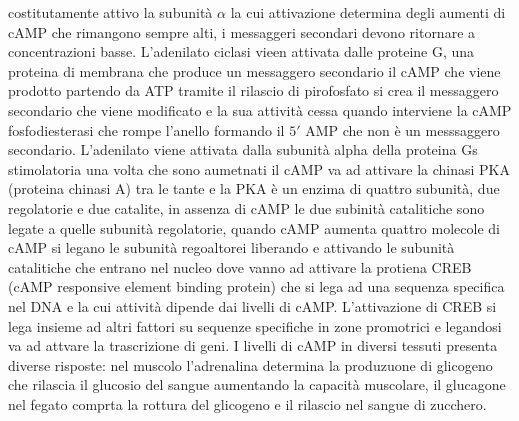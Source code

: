 costitutamente attivo la subunit\`a $\alpha$ la cui attivazione determina degli aumenti di cAMP che rimangono sempre alti, i messaggeri secondari devono ritornare a concentrazioni 
basse. L'adenilato ciclasi vieen attivata dalle proteine G, una proteina di membrana che produce un messaggero secondario il cAMP che viene prodotto partendo da ATP tramite il rilascio
di pirofosfato si crea il messaggero secondario che viene modificato e la sua attivit\`a cessa quando interviene la cAMP fosfodiesterasi che rompe l'anello formando il $5'$ AMP che non
\`e un messsaggero secondario. L'adenilato viene attivata dalla subunit\`a alpha della proteina Gs stimolatoria una volta che sono aumetnati il cAMP va ad attivare la chinasi PKA 
(proteina chinasi A) tra le tante e la PKA \`e un enzima di quattro subunit\`a, due regolatorie e due catalite, in assenza di cAMP le due subinit\`a catalitiche sono legate a quelle
subunit\`a regolatorie, quando cAMP aumenta quattro molecole di cAMP si legano le subunit\`a regoaltorei liberando e attivando le subunit\`a catalitiche che entrano nel nucleo dove vanno
ad attivare la protiena CREB (cAMP responsive element binding protein) che si lega ad una sequenza specifica nel DNA e la cui attivit\`a dipende dai livelli di cAMP. L'attivazione di
CREB si lega insieme ad altri fattori su sequenze specifiche in zone promotrici e legandosi va ad attvare la trascrizione di geni. I livelli di cAMP in diversi tessuti presenta diverse
risposte: nel muscolo l'adrenalina determina la produzuone di glicogeno che rilascia il glucosio del sangue aumentando la capacit\`a muscolare, il glucagone nel fegato comprta la rottura
del glicogeno e il rilascio nel sangue di zucchero. 


